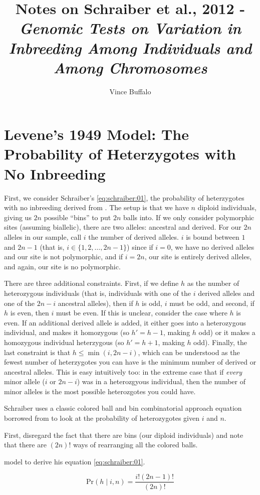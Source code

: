 \documentclass[12pt]{article}\usepackage[]{graphicx}\usepackage[]{color}
\begin{document}
\title{Notes on Schraiber et al., 2012 - \emph{Genomic Tests on Variation in Inbreeding Among Individuals and Among Chromosomes}}
\author{Vince Buffalo}
\maketitle

\section{Levene's 1949 Model: The Probability of Heterzygotes with No Inbreeding}

First, we consider Schraiber's \autoref{eq:schraiber:01}, the
probability of heterzygotes with no inbreeding derived from
\citep{Levene:1949va}. The setup is that we have $n$ diploid
individuals, giving us $2n$ possible ``bins'' to put $2n$ balls
into. If we only consider polymorphic sites (assuming biallelic),
there are two alleles: ancestral and derived. For our $2n$ alleles in
our sample, call $i$ the number of derived alleles. $i$ is bound
between $1$ and $2n-1$ (that is, $i \in \{1, 2, \ldots, 2n-1\}$) since
if $i=0$, we have no derived alleles and our site is not polymorphic,
and if $i=2n$, our site is entirely derived alleles, and again, our
site is no polymorphic.

There are three additional constraints. First, if we define $h$ as the
number of heterozygous individuals (that is, individuals with one of
the $i$ derived alleles and one of the $2n-i$ ancestral alleles), then
if $h$ is odd, $i$ must be odd, and second, if $h$ is even, then $i$
must be even. If this is unclear, consider the case where $h$ is
even. If an additional derived allele is added, it either goes into a
heterozygous individual, and makes it homozygous (so $h' = h - 1$,
making $h$ odd) or it makes a homozygous individual heterzygous (so
$h' = h + 1$, making $h$ odd). Finally, the last constraint is that $h
\le \min(i, 2n-i)$, which can be understood as the fewest number of
heterzygotes you can have is the minimum number of derived or
ancestral alleles. This is easy intuitively too: in the extreme case
that if \emph{every} minor allele ($i$ or $2n-i$) was in a
heterozgyous individual, then the number of minor alleles is the most
possible heterozgotes you could have.

Schraiber uses a classic colored ball and bin combinatorial approach
equation borrowed from \citep{Haldane:1954ts} to look at the
probability of heterozygotes given $i$ and $n$.


First, disregard the fact that there
are bins (our diploid individuals) and note that there are $(2n)!$
ways of rearranging all the colored balls.

 model to derive his
equation \autoref{eq:schraiber:01}. 

\begin{equation} \label{eq:schraiber:01}
  \text{Pr}(h \mid i, n) = \frac{i!(2n-1)!}{(2n)!}
\end{equation}



\end{document}
